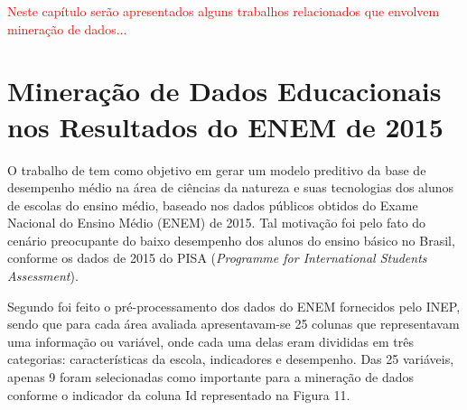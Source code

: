 \label{chapter:correlatos}

\par
\textcolor{red}{Neste capítulo serão apresentados alguns trabalhos relacionados que envolvem mineração de dados...} 

\section{Mineração de Dados Educacionais nos Resultados do ENEM de 2015}

\par
O trabalho de  tem como objetivo em gerar um modelo preditivo da base de desempenho médio na área de ciências da natureza e suas tecnologias dos alunos de escolas do ensino médio, baseado nos dados públicos obtidos do Exame Nacional do Ensino Médio (ENEM) de 2015. Tal motivação foi pelo fato do cenário preocupante do baixo desempenho dos alunos do ensino básico no Brasil, conforme os dados de 2015 do PISA (\textit{Programme for International Students Assessment}).

\par
Segundo  foi feito o pré-processamento dos dados do ENEM fornecidos pelo INEP, sendo que para cada área avaliada apresentavam-se 25 colunas que representavam uma informação ou variável, onde cada uma delas eram divididas em três categorias: características da escola, indicadores e desempenho. Das 25 variáveis, apenas 9 foram selecionadas como importante para a mineração de dados conforme o indicador da coluna Id representado na Figura 11. 

